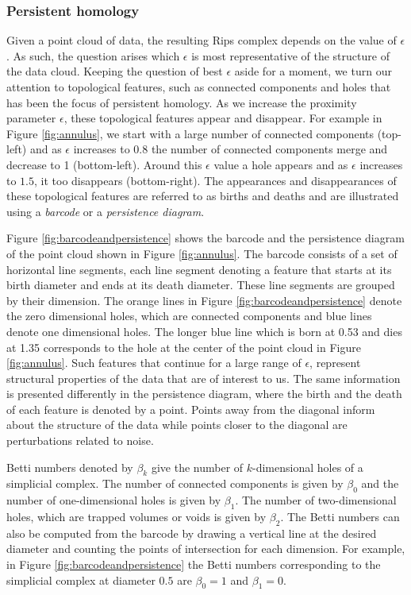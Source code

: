 \documentclass[11pt,a4paper,]{article}
\theoremstyle{definition}
\theoremstyle{definition}
\theoremstyle{definition}
\theoremstyle{remark}
\begin{document}
\hypertarget{persistent-homology}{%
\subsubsection{\texorpdfstring{Persistent homology \label{subsec:persistenthomology}}{Persistent homology }}\label{persistent-homology}}

Given a point cloud of data, the resulting Rips complex depends on the value of \(\epsilon\). As such, the question arises which \(\epsilon\) is most representative of the structure of the data cloud. Keeping the question of best \(\epsilon\) aside for a moment, we turn our attention to topological features, such as connected components and holes that has been the focus of persistent homology. As we increase the proximity parameter \(\epsilon\), these topological features appear and disappear. For example in Figure \ref{fig:annulus}, we start with a large number of connected components (top-left) and as \(\epsilon\) increases to \(0.8\) the number of connected components merge and decrease to 1 (bottom-left). Around this \(\epsilon\) value a hole appears and as \(\epsilon\) increases to \(1.5\), it too disappears (bottom-right). The appearances and disappearances of these topological features are referred to as births and deaths and are illustrated using a \textit{barcode} or a \textit{persistence diagram}.

Figure \ref{fig:barcodeandpersistence} shows the barcode and the persistence diagram of the point cloud shown in Figure \ref{fig:annulus}. The barcode consists of a set of horizontal line segments, each line segment denoting a feature that starts at its birth diameter and ends at its death diameter. These line segments are grouped by their dimension. The orange lines in Figure \ref{fig:barcodeandpersistence} denote the zero dimensional holes, which are connected components and blue lines denote one dimensional holes. The longer blue line which is born at 0.53 and dies at 1.35 corresponds to the hole at the center of the point cloud in Figure \ref{fig:annulus}. Such features that continue for a large range of \(\epsilon\), represent structural properties of the data that are of interest to us. The same information is presented differently in the persistence diagram, where the birth and the death of each feature is denoted by a point. Points away from the diagonal inform about the structure of the data while points closer to the diagonal are perturbations related to noise.

Betti numbers denoted by \(\beta_k\) give the number of \(k\)-dimensional holes of a simplicial complex. The number of connected components is given by \(\beta_0\) and the number of one-dimensional holes is given by \(\beta_1\). The number of two-dimensional holes, which are trapped volumes or voids is given by \(\beta_2\). The Betti numbers can also be computed from the barcode by drawing a vertical line at the desired diameter and counting the points of intersection for each dimension. For example, in Figure \ref{fig:barcodeandpersistence} the Betti numbers corresponding to the simplicial complex at diameter \(0.5\) are \(\beta_0 = 1\) and \(\beta_1 = 0\).
\end{document}
